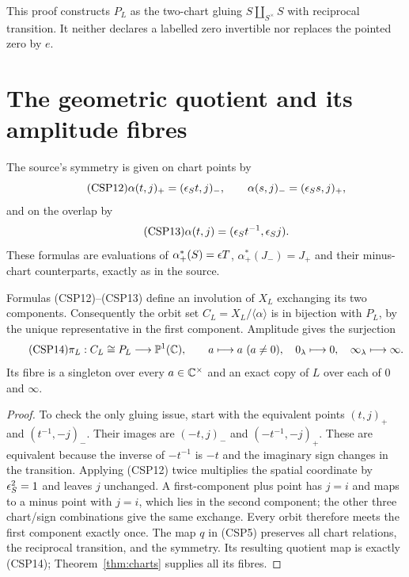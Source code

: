 This proof constructs $P_L$ as the two-chart gluing
$S\coprod_{S^\times}S$ with reciprocal transition.  It neither
declares a labelled zero invertible nor replaces the pointed zero by
$e$.

\section{The geometric quotient and its amplitude fibres}

The source's symmetry is given on chart points by
\begin{equation}\tag{CSP12}
 \alpha(t,j)_+=(\epsilon_St,j)_-,\qquad
 \alpha(s,j)_-=(\epsilon_Ss,j)_+,
\end{equation}
and on the overlap by
\begin{equation}\tag{CSP13}
 \alpha(t,j)=(\epsilon_St^{-1},\epsilon_Sj).
\end{equation}
These formulas are evaluations of
$\alpha_+^*(S)=\epsilon T$, $\alpha_+^*(J_-)=J_+$ and their
minus-chart counterparts, exactly as in the source.

\begin{theorem}\label{thm:quotient}
Formulas (CSP12)--(CSP13) define an involution of $X_L$ exchanging
its two components.  Consequently the orbit set
$C_L=X_L/\langle\alpha\rangle$ is in bijection with $P_L$, by the
unique representative in the first component.  Amplitude gives the
surjection
\begin{equation}\tag{CSP14}
 \pi_L:C_L\cong P_L\longrightarrow\mathbb P^1(\mathbb C),\qquad
 a\longmapsto a\ (a\ne0),\quad
 0_\lambda\longmapsto0,\quad \infty_\lambda\longmapsto\infty.
\end{equation}
Its fibre is a singleton over every $a\in\mathbb C^\times$ and an exact
copy of $L$ over each of $0$ and $\infty$.
\end{theorem}
\begin{proof}
To check the only gluing issue, start with the equivalent points
$(t,j)_+$ and $(t^{-1},-j)_-$.  Their images are
$(-t,j)_-$ and $(-t^{-1},-j)_+$.  These are equivalent because the
inverse of $-t^{-1}$ is $-t$ and the imaginary sign changes in the
transition.  Applying (CSP12) twice multiplies the spatial coordinate
by $\epsilon_S^2=1$ and leaves $j$ unchanged.  A first-component plus
point has $j=i$ and maps to a minus point with $j=i$, which lies in
the second component; the other three chart/sign combinations give
the same exchange.  Every orbit therefore meets the first component
exactly once.  The map $q$ in (CSP5) preserves all chart relations,
the reciprocal transition, and the symmetry.  Its resulting quotient
map is exactly (CSP14); Theorem~\ref{thm:charts} supplies all its
fibres.
\end{proof}

